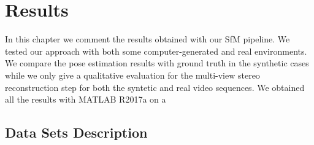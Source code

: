 \chapter{Results}
In this chapter we comment the results obtained with our SfM pipeline.
We tested our approach with both some computer-generated and real environments.
We compare the pose estimation results with ground truth in the synthetic cases
while we only give a qualitative evaluation for the multi-view stereo
reconstruction step for both the syntetic and real video sequences.
We obtained all the results with MATLAB R2017a on a 

\section{Data Sets Description}
